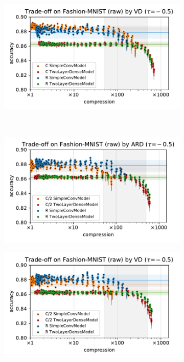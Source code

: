 \documentclass[a4paper,10pt,onecolumn]{article}
\begin{document}
\begin{figure}[b]
\begin{subfigure}[b]{0.5\columnwidth}
  \end{subfigure}%
  \begin{subfigure}[b]{0.5\columnwidth}
    \centering
    \includegraphics[width=\columnwidth]{figure__mnist-like__trade-off/appendix__VD__fashionmnist__raw__-0.5.pdf}
  \end{subfigure} \\ %
  \begin{subfigure}[b]{0.5\columnwidth}
    \centering
    \includegraphics[width=\columnwidth]{figure__mnist-like__trade-off/appendix__cmp__ARD__fashionmnist__raw__-0.5.pdf}
  \end{subfigure}%
  \begin{subfigure}[b]{0.5\columnwidth}
    \centering
    \includegraphics[width=\columnwidth]{figure__mnist-like__trade-off/appendix__cmp__VD__fashionmnist__raw__-0.5.pdf}

\end{subfigure}
\end{figure}
\end{document}
